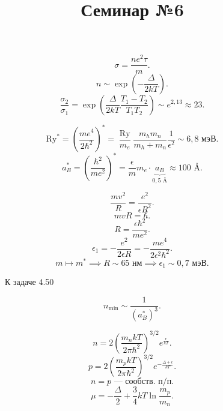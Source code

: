 \documentclass[a4paper]{article}
\title{Семинар №6}
\begin{document}
	\maketitle
	\begin{hiProb}[0-6-1]
		
	\end{hiProb}
\begin{sol}
\[
\sigma= \frac{ne^2 \tau}{m}
.\] 
\[
	n \sim \exp \left( -\frac{\Delta}{2kT} \right) 
.\] 
\[
	\frac{\sigma_2}{\sigma_1}= \exp \left(  \frac{\Delta}{2kT} \frac{T_1-T_2}{T_1 T_2} \right) \sim 
	e^{2,13}\approx 23
.\] 
\end{sol}
\begin{hiProb}[0-6-2]

\end{hiProb}
\begin{sol}
\[
	\text{Ry}^*= \left( \frac{m e^4}{2\hbar^2} \right)^* =
	\frac{\operatorname{Ry}}{m_e} \frac{m_h m_n}{m_h+m_n} \frac{1}{\epsilon^2}
	\sim 6,8\text{ мэВ}
.\] 
\[
	a_B^*= \left( \frac{\hbar^2}{me^2} \right) ^*=
	\frac{\epsilon }{m} m_e \cdot \underbrace{a_B}_{0,5 \text{ \AA}} \approx 100 \text{ \AA}
.\] 
\end{sol}
\begin{hiProb}[4.2]
\end{hiProb}
\begin{sol}
\[
\frac{mv^2}{R}= \frac{e^2}{\epsilon R^2}
.\] 
\[
mvR=\hbar
.\] 
\[
R= \frac{\epsilon \hbar^2}{m e^2}
.\] 
\[
\epsilon_1= -\frac{e^2}{2\epsilon R}=- \frac{me^4}{2\epsilon^2 \hbar^2}
.\] 
\[
m \mapsto m^* \implies R \sim  65\text{ нм} \implies \epsilon_1\sim 0,7\text{ мэВ}
.\] 
\end{sol}
\begin{hiProb}[4.50]
\end{hiProb}
\begin{sol}
\begin{figure}[ht]
    \centering
    \caption{К задаче 4.50}
    \label{fig:1}
\end{figure}
\[
	n_{\text{min}}\sim \frac{1}{\left( a^*_B \right) ^3}
.\] 
\end{sol}
\[
	n= 2 \left( \frac{m_n k T}{2\pi \hbar^2} \right) ^{3 /2}
	e^{\frac{\epsilon}{kT}}
.\] 
\[
	p= 2 \left( \frac{m_p kT}{2\pi \hbar^2} \right) ^{3 /2}
	e^{- \frac{\Delta+\epsilon }{kT}}
.\] 
\[
n=p \text{ --- сообств. п/п}
.\] 
\[
\mu= -\frac{\Delta}{2} +\frac{3}{4} kT \ln \frac{m_p}{m_n}
.\] 
\begin{figure}[ht]
    \centering
    \caption{}
    \label{fig:2}
\end{figure}
\end{document}
